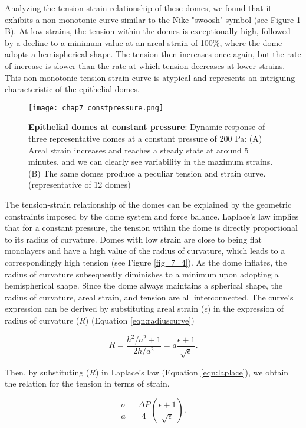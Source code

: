 Analyzing the tension-strain relationship of these domes, we found that it exhibits a non-monotonic curve similar to the Nike "swoosh" symbol (see Figure \ref{fig_7_3} B). At low strains, the tension within the domes is exceptionally high, followed by a decline to a minimum value at an areal strain of 100\%, where the dome adopts a hemispherical shape. The tension then increases once again, but the rate of increase is slower than the rate at which tension decreases at lower strains. This non-monotonic tension-strain curve is atypical and represents an intriguing characteristic of the epithelial domes.

\begin{figure}[b!]
	\centering
	\texttt{[image: chap7\_constpressure.png]}
	\caption{\label{fig_7_3} \textbf{Epithelial domes at constant pressure}: Dynamic response of three representative domes at a constant pressure of 200 Pa: (A) Areal strain increases and reaches a steady state at around 5 minutes, and we can clearly see variability in the maximum strains. (B) The same domes produce a peculiar tension and strain curve. (representative of 12 domes)
	}
\end{figure}

The tension-strain relationship of the domes can be explained by the geometric constraints imposed by the dome system and force balance. Laplace’s law implies that for a constant pressure, the tension within the dome is directly proportional to its radius of curvature. Domes with low strain are close to being flat monolayers and have a high value of the radius of curvature, which leads to a correspondingly high tension  (see Figure \ref{fig_7_4}). As the dome inflates, the radius of curvature subsequently diminishes to a minimum upon adopting a hemispherical shape. Since the dome always maintains a spherical shape, the radius of curvature, areal strain, and tension are all interconnected. The curve's expression can be derived by substituting areal strain ($\epsilon$) in the expression of radius of curvature ($R$) (Equation \ref{eqn:radiuscurve})

\begin{equation}
	R = \frac{h^2/a^2 + 1}{2h/a^2} = a\frac{\epsilon + 1}{\sqrt{\epsilon}}.
\end{equation}

Then, by substituting ($R$) in Laplace's law (Equation \ref{eqn:laplace}), we obtain the relation for the tension in terms of strain.

\begin{equation}
	\label{eqn:isobaric}
	\frac{\sigma}{a} = \frac{\Delta P}{4} \left( \frac{\epsilon + 1}{\sqrt{\epsilon}} \right).
\end{equation}

